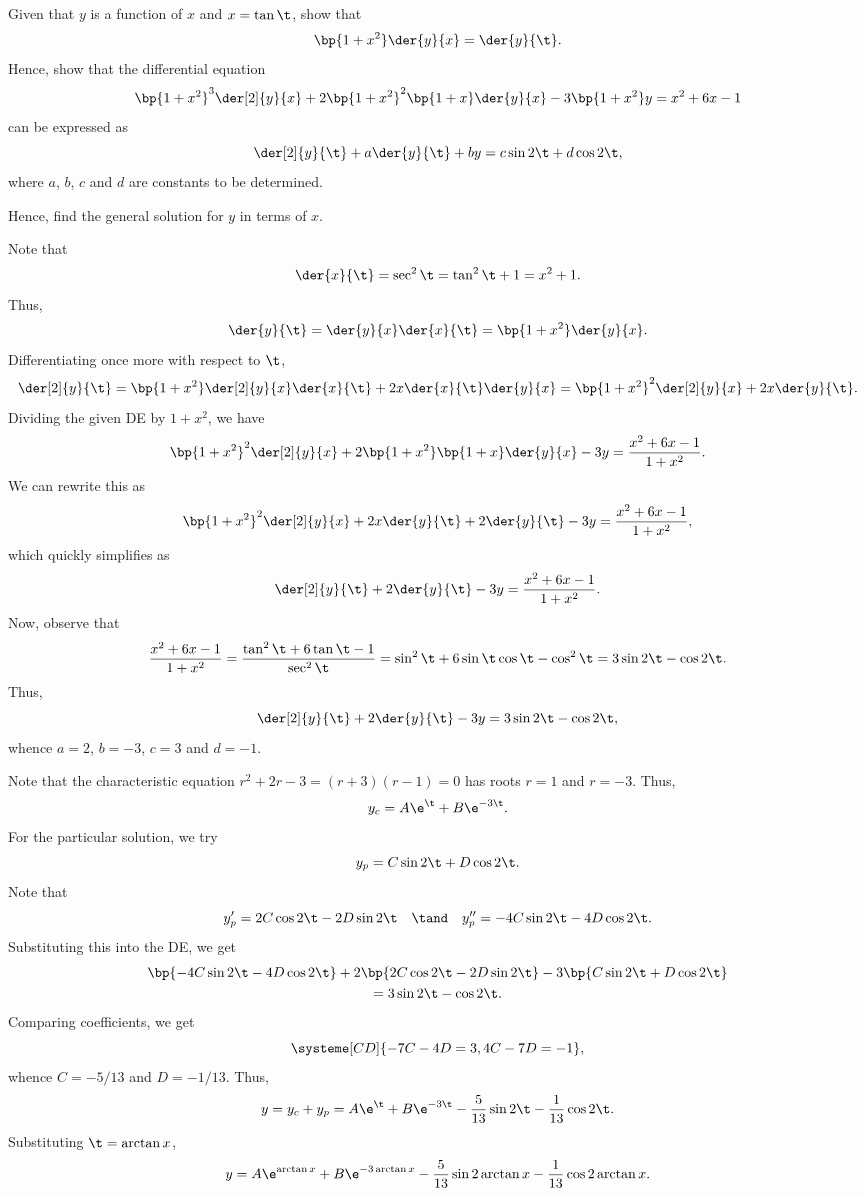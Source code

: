 \begin{problem}
    Given that $y$ is a function of $x$ and $x = \tan \t$, show that \[\bp{1 + x^2} \der{y}{x} = \der{y}{\t}.\] Hence, show that the differential equation \[\bp{1 + x^2}^3 \der[2]{y}{x} + 2\bp{1 + x^2}^2 \bp{1 + x} \der{y}{x} - 3\bp{1 + x^2} y = x^2 + 6x - 1\] can be expressed as \[\der[2]{y}{\t} + a \der{y}{\t} + by = c \sin 2\t + d \cos 2\t,\] where $a$, $b$, $c$ and $d$ are constants to be determined.

    Hence, find the general solution for $y$ in terms of $x$.
\end{problem}
\begin{solution}
    Note that \[\der{x}{\t} = \sec^2 \t = \tan^2 \t + 1 = x^2 + 1.\] Thus, \[\der{y}{\t} = \der{y}{x} \der{x}{\t} = \bp{1 + x^2} \der{y}{x}.\] Differentiating once more with respect to $\t$, \[\der[2]{y}{\t} = \bp{1 + x^2} \der[2]{y}{x} \der{x}{\t} + 2x \der{x}{\t} \der{y}{x} = \bp{1 + x^2}^2 \der[2]{y}{x} + 2x \der{y}{\t}.\] Dividing the given DE by $1 + x^2$, we have \[\bp{1 + x^2}^2 \der[2]{y}{x} + 2\bp{1 + x^2} \bp{1 + x} \der{y}{x} - 3 y = \frac{x^2 + 6x - 1}{1 + x^2}.\] We can rewrite this as \[\bp{1 + x^2}^2 \der[2]{y}{x} + 2x\der{y}{\t} + 2\der{y}{\t} - 3 y = \frac{x^2 + 6x - 1}{1 + x^2},\] which quickly simplifies as \[\der[2]{y}{\t} + 2 \der{y}{\t} - 3y =  \frac{x^2 + 6x - 1}{1 + x^2}.\] Now, observe that \[\frac{x^2 + 6x - 1}{1 + x^2} = \frac{\tan^2 \t + 6\tan \t - 1}{\sec^2 \t} = \sin^2 \t + 6\sin\t\cos\t - \cos^2\t = 3\sin2\t - \cos2\t.\] Thus, \[\der[2]{y}{\t} + 2 \der{y}{\t} - 3y = 3\sin2\t - \cos2\t,\] whence $a = 2$, $b = -3$, $c = 3$ and $d = -1$.
	
	Note that the characteristic equation $r^2 + 2r - 3 = (r+3)(r-1) = 0$ has roots $r = 1$ and $r = -3$. Thus, \[y_c = A\e^{\t} + B\e^{-3\t}.\] For the particular solution, we try \[y_p = C\sin 2\t + D \cos 2\t.\] Note that \[y_p' = 2C \cos 2\t - 2D \sin 2\t \quad \tand \quad y_p'' = -4C \sin 2\t - 4D \cos 2\t.\] Substituting this into the DE, we get
    \begin{gather*}
        \bp{-4C \sin 2\t - 4D \cos 2\t} + 2\bp{2C \cos 2\t - 2D \sin 2\t} - 3\bp{C\sin 2\t + D \cos 2\t}\\
        = 3\sin 2\t - \cos 2\t.
    \end{gather*}
    Comparing coefficients, we get \[\systeme[CD]{-7C-4D = 3,4C-7D=-1},\] whence $C = -5/13$ and $D = -1/13$. Thus, \[y = y_c + y_p =  A\e^{\t} + B\e^{-3\t} - \frac5{13} \sin 2\t - \frac1{13} \cos 2\t.\] Substituting $\t = \arctan x$, \[y = A\e^{\arctan x} + B\e^{-3\arctan x} - \frac5{13} \sin{2\arctan x} - \frac1{13} \cos{2\arctan x}.\]
\end{solution}

